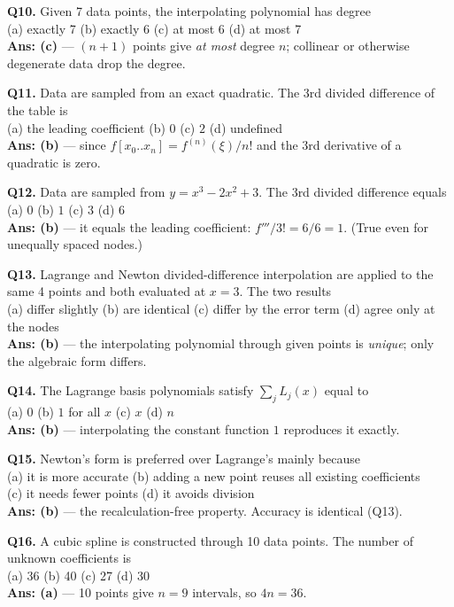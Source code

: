 \begin{mcqbox}
\textbf{Q10.} Given 7 data points, the interpolating polynomial has degree\\
(a) exactly 7 \quad (b) exactly 6 \quad (c) at most 6 \quad (d) at most 7\\
\textbf{Ans: (c)} --- $(n+1)$ points give \emph{at most} degree $n$; collinear or otherwise degenerate data drop the degree.

\textbf{Q11.} Data are sampled from an exact quadratic. The 3rd divided difference of the table is\\
(a) the leading coefficient \quad (b) $0$ \quad (c) $2$ \quad (d) undefined\\
\textbf{Ans: (b)} --- since $f[x_0..x_n] = f^{(n)}(\xi)/n!$ and the 3rd derivative of a quadratic is zero.

\textbf{Q12.} Data are sampled from $y = x^3-2x^2+3$. The 3rd divided difference equals\\
(a) $0$ \quad (b) $1$ \quad (c) $3$ \quad (d) $6$\\
\textbf{Ans: (b)} --- it equals the leading coefficient: $f'''/3! = 6/6 = 1$. (True even for unequally spaced nodes.)

\textbf{Q13.} Lagrange and Newton divided-difference interpolation are applied to the same 4 points and both evaluated at $x=3$. The two results\\
(a) differ slightly \quad (b) are identical \quad (c) differ by the error term \quad (d) agree only at the nodes\\
\textbf{Ans: (b)} --- the interpolating polynomial through given points is \emph{unique}; only the algebraic form differs.

\textbf{Q14.} The Lagrange basis polynomials satisfy $\sum_j L_j(x)$ equal to\\
(a) $0$ \quad (b) $1$ for all $x$ \quad (c) $x$ \quad (d) $n$\\
\textbf{Ans: (b)} --- interpolating the constant function $1$ reproduces it exactly.

\textbf{Q15.} Newton's form is preferred over Lagrange's mainly because\\
(a) it is more accurate \quad (b) adding a new point reuses all existing coefficients\\
(c) it needs fewer points \quad (d) it avoids division\\
\textbf{Ans: (b)} --- the recalculation-free property. Accuracy is identical (Q13).

\textbf{Q16.} A cubic spline is constructed through 10 data points. The number of unknown coefficients is\\
(a) 36 \quad (b) 40 \quad (c) 27 \quad (d) 30\\
\textbf{Ans: (a)} --- 10 points give $n = 9$ intervals, so $4n = 36$.


\end{mcqbox}
